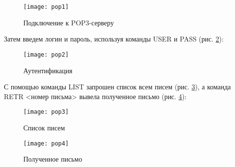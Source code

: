 \begin{figure}[H]
	\begin{center}
		\texttt{[image: pop1]}
		\caption{Подключение к POP3-серверу} 
		\label{pic:pop1} %
	\end{center}
\end{figure}

Затем введем логин и пароль, используя команды USER и PASS  (рис. \ref{pic:pop2}):

\begin{figure}[H]
	\begin{center}
		\texttt{[image: pop2]}
		\caption{Аутентификация} 
		\label{pic:pop2} %
	\end{center}
\end{figure}

С помощью команды LIST запрошен список всем писем  (рис. \ref{pic:pop3}), а команда RETR <номер письма> вывела полученное письмо (рис. \ref{pic:pop4}):

\begin{figure}[H]
	\begin{center}
		\texttt{[image: pop3]}
		\caption{Список писем} 
		\label{pic:pop3} %
	\end{center}
\end{figure}

\begin{figure}[H]
	\begin{center}
		\texttt{[image: pop4]}
		\caption{Полученное письмо} 
		\label{pic:pop4} %
	\end{center}
\end{figure}


